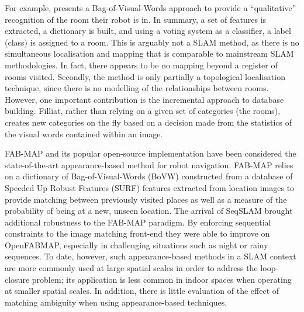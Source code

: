 For example, \citet{filliat2007visual} presents a Bag-of-Visual-Words approach to provide a ``qualitative'' recognition of the room their robot is in. In summary, a set of features is extracted, a dictionary is built, and using a voting system as a classifier, a label (class) is assigned to a room. This is arguably not a SLAM method, as there is no simultaneous localisation and mapping that is comparable to mainstream SLAM methodologies. In fact, there appears to be no mapping beyond a register of rooms visited. Secondly, the method is only partially a topological localisation technique, since there is no modelling of the relationships between rooms. However, one important contribution is the incremental approach to database building. Filliat, rather than relying on a given set of categories (the rooms), creates new categories on the fly based on a decision made from the statistics of the visual words contained within an image.

FAB-MAP \citep{cumminsFabMap2010} and its popular open-source implementation \citep{OpenFabMap2011} have been considered the state-of-the-art appearance-based method for robot navigation. FAB-MAP relies on a dictionary of Bag-of-Visual-Words (BoVW) constructed from a database of Speeded Up Robust Features (SURF) features extracted from location images to provide matching between previously visited places as well as a measure of the probability of being at a new, unseen location. The arrival of SeqSLAM \citep{milford2012seqslam} brought additional robustness to the FAB-MAP paradigm. By enforcing sequential constraints to the image matching front-end they were able to improve on OpenFABMAP, especially in challenging situations such as night or rainy sequences. To date, however, such appearance-based methods in a SLAM context are more commonly used at large spatial scales in order to address the loop-closure problem; its application is less common in indoor spaces when operating at smaller spatial scales. In addition, there is little evaluation of the effect of matching ambiguity when using appearance-based techniques. 

